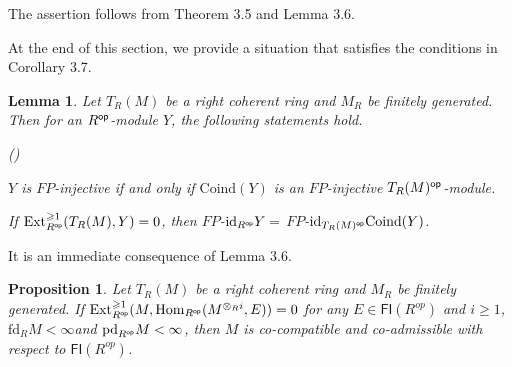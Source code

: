 \documentclass[10pt,twoside]{amsart}
\theoremstyle{bfupright head,slanted body}
\theoremstyle{bfupright head,upright body}
\theoremstyle{fixed bf head,slanted body}
\newtheorem{prp}[res]{Proposition}      \newtheorem*{prp*}{Proposition}
\newtheorem{lem}[res]{Lemma}            \newtheorem*{lem*}{Lemma}
\theoremstyle{fixed bf head,upright body}
\theoremstyle{numbered paragraph}
\newlength{\thmlistleft}        %
\newlength{\thmlistright}       %
\newlength{\thmlistpartopsep}   %
\newlength{\thmlisttopsep}      %
\newlength{\thmlistparsep}      %
\newlength{\thmlistitemsep}     %
\newcounter{prt}
\newenvironment{prt}{\begin{list}{\upshape (\alph{prt})}%
    {\usecounter{prt}%
      \setlength{\leftmargin}{\thmlistleft}%
      \setlength{\labelwidth}{\thmlistleft}%
      \setlength{\rightmargin}{\thmlistright}%
      \setlength{\partopsep}{\thmlistpartopsep}%
      \setlength{\topsep}{\thmlisttopsep}%
      \setlength{\parsep}{\thmlistparsep}%
      \setlength{\itemsep}{\thmlistitemsep}}}%
  {\end{list}}%
\newenvironment{prf*}[1][Proof]{%
  \begin{proof}[\bf #1]
    \setcounter{equation}{0}
    \renewcommand{\theequation}{\arabic{equation}}}
  {\end{proof}
  }
\numberwithin{equation}{res}
\newcommand{\id}{\mathrm{id}}
\newcommand{\fd}{\mathrm{fd}}
\newcommand{\pd}{\mathrm{pd}}
\newcommand{\FI}{\mathsf{FI}}
\newcommand{\Coind}{\mathrm{Coind}}
\newcommand{\Rop}{R^{\sf op}}
\newcommand{\op}{\sf op}
\newcommand{\Hom}{\operatorname{Hom}}
\newcommand{\Ext}{\operatorname{Ext}}
\begin{document}
\begin{prf*}
The assertion follows from Theorem 3.5 and Lemma 3.6.
\end{prf*}


At the end of this section, we provide a situation that satisfies the conditions in Corollary 3.7.

\begin{lem} \label{Inj of Ind-}
Let $T_R(M)$ be a right coherent ring and $M_{R}$ be finitely generated.
Then for an $\Rop$-module $Y$, the following statements hold.
\begin{prt}
\item $Y$ is $FP$-injective if and only if $\Coind(Y)$ is an $FP$-injective $T_R(M)^{\op}$-module.
\item If $\Ext^{\geqslant 1}_{\Rop}(T_R(M),Y)=0$, then $FP$-$\id_{\Rop}Y=$ $FP$-$\id_{T_R(M)^{\op}}\Coind(Y)$.
\end{prt}
\end{lem}
 
 \begin{prf*}
It is an immediate consequence of Lemma 3.6.
\end{prf*}

\begin{prp} \label{example of coadmissible and cocompatible}
Let $T_R(M)$ be a right coherent ring and $M_{R}$ be finitely generated.
If $\Ext_{\Rop}^{\geqslant 1}(M, \Hom_{\Rop}(M^{\otimes_Ri}, E))=0$ for any $E\in\FI(R^{op})$ and $i\geqslant 1$,
$\fd_{R}M<\infty$and $\pd_{\Rop}M<\infty$,
then $M$ is co-compatible and co-admissible  with respect to $\FI(R^{op})$.
\end{prp}
\end{document}
